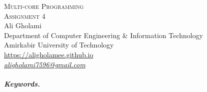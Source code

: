 \documentclass[12pt]{article}
\numberwithin{equation}{section}
\numberwithin{table}{section}
\numberwithin{figure}{section}
\begin{document}

\begin{center}
\textsc{\Huge Multi-core Programming} \\[2pt]
	\textsc{\Large Assignment 4}\\
	\vspace{0.5cm}
  Ali Gholami \\[6pt]
  Department of Computer Engineering \& Information Technology\\
  Amirkabir University of Technology  \\[6pt]
  \def\UrlFont{\em}
  \url{https://aligholamee.github.io}\\
\href{mailto:aligholami7596@gmail.com}{\textit{aligholami7596@gmail.com}}
\end{center}

\begin{abstract}

\end{abstract} 

\subparagraph{Keywords.} \textit{}
\end{document}
